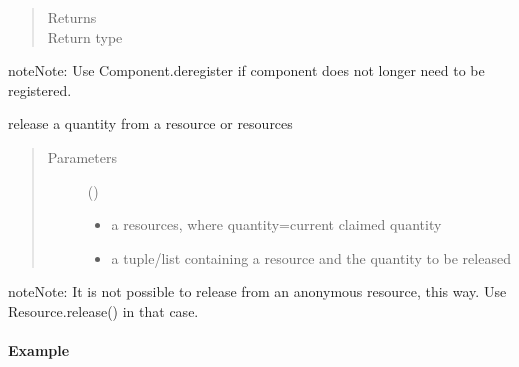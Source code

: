 \documentclass[letterpaper,10pt,english]{sphinxmanual}
\begin{document}
\begin{fulllineitems}
\begin{fulllineitems}
\begin{quote}
\begin{description}
\item[{Returns}] \leavevmode
{}

\item[{Return type}] \leavevmode
{\hyperref[\detokenize{Reference:salabim.Component}]{}}

\end{description}\end{quote}

\begin{sphinxadmonition}{note}{Note:}
Use Component.deregister if component does not longer need to be registered.
\end{sphinxadmonition}

\end{fulllineitems}


\begin{fulllineitems}
\label{\detokenize{Reference:salabim.Component.release}}
release a quantity from a resource or resources
\begin{quote}\begin{description}
\item[{Parameters}] \leavevmode
{} (\sphinxstyleliteralemphasis{, }) \textendash{} \begin{itemize}
\item {} 
a resources, where quantity=current claimed quantity

\item {} 
a tuple/list containing a resource and the quantity to be released

\end{itemize}


\end{description}\end{quote}

\begin{sphinxadmonition}{note}{Note:}
It is not possible to release from an anonymous resource, this way.
Use Resource.release() in that case.
\end{sphinxadmonition}
\paragraph{Example}


\end{fulllineitems}
\end{fulllineitems}
\end{document}
